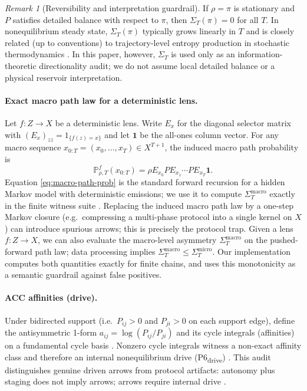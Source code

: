 \documentclass[11pt]{article}
\theoremstyle{definition}
\theoremstyle{remark}
\newtheorem{remark}[theorem]{Remark}
\begin{document}
\begin{remark}[Reversibility and interpretation guardrail]
If $\rho=\pi$ is stationary and $P$ satisfies detailed balance with respect to $\pi$, then $\Sigma_T(\pi)=0$ for all $T$.
In nonequilibrium steady state, $\Sigma_T(\pi)$ typically grows linearly in $T$ and is closely related (up to conventions) to trajectory-level entropy production in stochastic thermodynamics \citep{seifert2012,lebowitzspohn1999}.
In this paper, however, $\Sigma_T$ is used only as an information-theoretic directionality audit; we do not assume local detailed balance or a physical reservoir interpretation.
\end{remark}

\paragraph{Exact macro path law for a deterministic lens.}
Let $f:Z\to X$ be a deterministic lens.
Write $E_x$ for the diagonal selector matrix with $(E_x)_{zz}=1_{\{f(z)=x\}}$ and let $\mathbf 1$ be the all-ones column vector.
For any macro sequence $x_{0:T}=(x_0,\dots,x_T)\in X^{T+1}$, the induced macro path probability is
\begin{equation}
\label{eq:macro-path-prob}
\mathbb P^{f}_{\rho,T}(x_{0:T})
=
\rho E_{x_0} P E_{x_1}\cdots P E_{x_T}\mathbf 1.
\end{equation}
Equation \eqref{eq:macro-path-prob} is the standard forward recursion for a hidden Markov model with deterministic emissions; we use it to compute $\Sigma_T^{\mathrm{macro}}$ exactly in the finite witness suite \citep{rabiner1989}.
Replacing the induced macro path law by a one-step Markov closure (e.g.\ compressing a multi-phase protocol into a single kernel on $X$) can introduce spurious arrows; this is precisely the protocol trap.
Given a lens $f:Z\to X$, we can also evaluate the macro-level asymmetry $\Sigma_T^{\mathrm{macro}}$ on the pushed-forward path law; data processing implies $\Sigma_T^{\mathrm{macro}}\le \Sigma_T^{\mathrm{micro}}$.
Our implementation computes both quantities exactly for finite chains, and uses this monotonicity as a semantic guardrail against false positives.

\paragraph{ACC affinities (drive).}
Under bidirected support (i.e.\ $P_{ij}>0$ and $P_{ji}>0$ on each support edge), define the antisymmetric 1-form
$a_{ij}=\log(P_{ij}/P_{ji})$ and its cycle integrals (affinities) on a fundamental cycle basis \citep{kolmogorov1936}.
Nonzero cycle integrals witness a non-exact affinity class and therefore an internal nonequilibrium drive (P6\textsubscript{drive}) \citep{schnakenberg1976}.
This audit distinguishes genuine driven arrows from protocol artifacts: autonomy plus staging does not imply arrows; arrows require internal drive \citep{kelly1979}.
\end{document}
